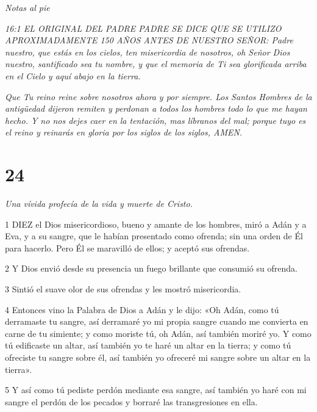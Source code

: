 \par \textit{Notas al pie}

\par \textit{16:1 EL ORIGINAL DEL PADRE PADRE SE DICE QUE SE UTILIZO APROXIMADAMENTE 150 AÑOS ANTES DE NUESTRO SEÑOR: Padre nuestro, que estás en los cielos, ten misericordia de nosotros, oh Señor Dios nuestro, santificado sea tu nombre, y que el memoria de Ti sea glorificada arriba en el Cielo y aquí abajo en la tierra.}

\par \textit{Que Tu reino reine sobre nosotros ahora y por siempre. Los Santos Hombres de la antigüedad dijeron remiten y perdonan a todos los hombres todo lo que me hayan hecho. Y no nos dejes caer en la tentación, mas líbranos del mal; porque tuyo es el reino y reinarás en gloria por los siglos de los siglos, AMEN.}

\chapter{24}

\par \textit{Una vívida profecía de la vida y muerte de Cristo.}

\par 1 DIEZ el Dios misericordioso, bueno y amante de los hombres, miró a Adán y a Eva, y a su sangre, que le habían presentado como ofrenda; sin una orden de Él para hacerlo. Pero Él se maravilló de ellos; y aceptó sus ofrendas.

\par 2 Y Dios envió desde su presencia un fuego brillante que consumió su ofrenda.

\par 3 Sintió el suave olor de sus ofrendas y les mostró misericordia.

\par 4 Entonces vino la Palabra de Dios a Adán y le dijo: «Oh Adán, como tú derramaste tu sangre, así derramaré yo mi propia sangre cuando me convierta en carne de tu simiente; y como moriste tú, oh Adán, así también moriré yo. Y como tú edificaste un altar, así también yo te haré un altar en la tierra; y como tú ofreciste tu sangre sobre él, así también yo ofreceré mi sangre sobre un altar en la tierra».

\par 5 Y así como tú pediste perdón mediante esa sangre, así también yo haré con mi sangre el perdón de los pecados y borraré las transgresiones en ella.


